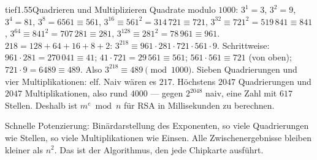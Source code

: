 \begin{loesungkarte}{tief}{1.55}{Quadrieren und Multiplizieren}
Quadrate modulo $1000$: $3^{1} = 3$, $3^{2} = 9$, $3^{4} = 81$, $3^{8} = 6561\equiv561$, $3^{16}\equiv561^{2} = 314\,721\equiv721$, $3^{32}\equiv721^{2} = 519\,841\equiv841$, $3^{64}\equiv841^{2} = 707\,281\equiv281$, $3^{128}\equiv281^{2} = 78\,961\equiv961$.
$218 = 128 + 64 + 16 + 8 + 2$: $3^{218}\equiv961\cdot281\cdot721\cdot561\cdot9$. Schrittweise: $961\cdot281 = 270\,041\equiv41$; $41\cdot721 = 29\,561\equiv561$; $561\cdot561\equiv721$ (von oben); $721\cdot9 = 6489\equiv489$. Also $3^{218}\equiv489\pmod{1000}$.
Sieben Quadrierungen und vier Multiplikationen: elf. Naiv wären es $217$.
Höchstens $2047$ Quadrierungen und $2047$ Multiplikationen, also rund $4000$ --- gegen $2^{2048}$ naiv, eine Zahl mit $617$ Stellen. Deshalb ist $m^{e}\bmod n$ für RSA in Millisekunden zu berechnen.
\begin{mitnehmen}\kastentext
Schnelle Potenzierung: Binärdarstellung des Exponenten, so viele Quadrierungen wie Stellen, so viele Multiplikationen wie Einsen. Alle Zwischenergebnisse bleiben kleiner als $n^{2}$. Das ist der Algorithmus, den jede Chipkarte ausführt.
\end{mitnehmen}
\end{loesungkarte}

